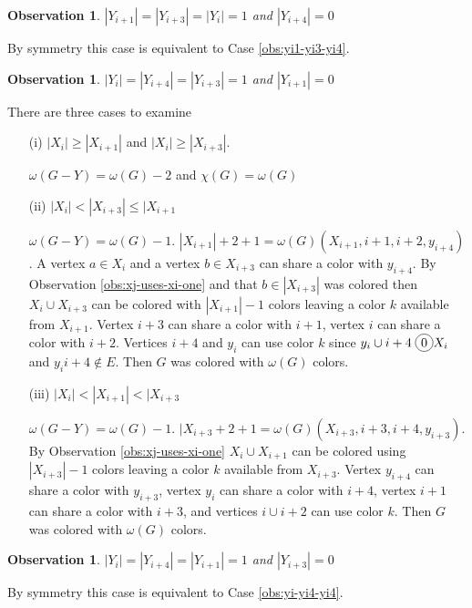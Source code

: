 \documentclass[12pt]{article}
\newcommand*\circled[1]{\tikz[baseline=(char.base)]{
            \node[shape=circle,draw,inner sep=2pt] (char) {#1};}}
\newtheorem{Observation}[Theorem]{Observation}
\begin{document}
\begin{Observation}\label{obs:yi1-yi3-yi} 
$|Y_{i+1}| = |Y_{i+3}| =  |Y_{i}| = 1$ and $|Y_{i+4}| = 0$
\end{Observation}
 By symmetry this case is equivalent to Case \ref{obs:yi1-yi3-yi4}.

\begin{Observation}\label{obs:yi-yi4-yi1} 
$|Y_{i}| = |Y_{i+4}| =  |Y_{i+3}| = 1$ and $|Y_{i+1}| = 0$
\end{Observation} There are three cases to examine
	\begin{itemize}
	\item[(i)]
		$|X_i| \geq |X_{i+1}|$ and $|X_i| \geq |X_{i+3}|$.

		$\omega(G - Y) = \omega(G) - 2$ and $\chi(G) = \omega(G)$
	\item[(ii)]
		$|X_i| < |X_{i+3}| \leq |X_{i+1}$

		$\omega(G - Y) = \omega(G) - 1$. $|X_{i+1}| + 2 + 1 = \omega(G) (X_{i+1}, i+1, i+2, y_{i+4})$. A vertex $a \in X_i$ and a vertex $b \in X_{i+3}$ can share a color with $y_{i+4}$. By Observation \ref{obs:xj-uses-xi-one} and that $b \in |X_{i+3}|$ was colored then $X_{i} \cup X_{i+3}$ can be colored with $|X_{i+1}| -1$ colors leaving a color $k$ available from $X_{i+1}$. Vertex $i+3$ can share a color with $i+1$, vertex $i$ can share a color with $i+2$. Vertices $i+4$ and $y_{i}$ can use color $k$ since $y_{i} \cup i+4 \; \circled{0} X_i$ and $y_{i}i+4 \not \in E$. Then $G$ was colored with $\omega(G)$ colors.

	\item[(iii)]
		$|X_i| < |X_{i+1}| < |X_{i+3}$

		$\omega(G - Y) = \omega(G) - 1$. $|X_{i+3} + 2 + 1 = \omega(G) (X_{i+3}, i+3, i+4, y_{i+3})$. By Observation \ref{obs:xj-uses-xi-one} $X_i \cup X_{i+1}$ can be colored using $|X_{i+3}| -1 $ colors leaving a color $k$ available from $X_{i+3}$. Vertex $y_{i+4}$ can share a color with $y_{i+3}$, vertex $y_i$ can share a color with $i+4$, vertex $i+1$ can share a color with $i+3$, and vertices $i \cup i+2$ can use color $k$. Then $G$ was colored with $\omega(G)$ colors. 
	\end{itemize}

\begin{Observation}\label{obs:yi-yi4-yi3} 
$|Y_{i}| = |Y_{i+4}| =  |Y_{i+1}| = 1$ and $|Y_{i+3}| = 0$
\end{Observation}
 By symmetry this case is equivalent to Case \ref{obs:yi-yi4-yi4}.
\end{document}
